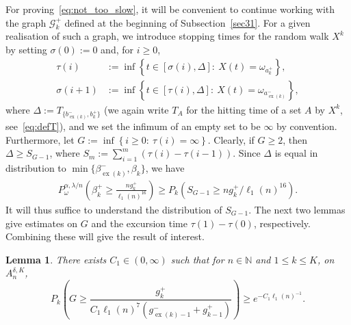 \documentclass[10pt]{amsart}
\newtheorem{lemm}[theo]{Lemma}\newtheorem{prop}[theo]{Proposition}\newtheorem{coro}[theo]{Corollary}\newtheorem{conj}[theo]{Conjecture}
\theoremstyle{definition}\newtheorem{defi}[theo]{Definition}\newtheorem{rema}[theo]{Remark}\newtheorem{exam}[theo]{Example}\newtheorem{exem}[theo]{Example}\newtheorem{nota}[theo]{Notation}
\newcommand{\N}{\mathbb N}
\newcommand{\clG}{\mathcal{G}}
\newcommand{\Pk}{{P_k}}
\newcommand\ex{\operatorname{ex}}
\newcommand{\aat}[1]{a_{\ex(#1)}^-}
\newcommand{\bt}[1]{b_{\ex(#1)}^-}
\newcommand{\gtt}[1]{g_{\ex(#1)-1}^-}
\newcommand{\betat}[1]{\beta^-_{\ex(#1)}}
\begin{document}
For proving~\eqref{eq:not_too_slow}, it will be convenient to continue working with the graph $\clG_k^+$ defined at the beginning of Subsection~\ref{sec31}. For a given realisation of such a graph, we introduce stopping times for the random walk $X^k$ by setting $\sigma(0):=0$ and, for $i\geq 0$,
\begin{align*}
\tau(i)&:=\inf\left\{t\in[\sigma(i),\Delta]:\:X(t)= \omega_{a_k^+}\right\},\\
\sigma(i+1)&:=\inf\left\{t\in [\tau(i),\Delta]:\:X(t)=\omega_{\aat{k}}\right\},
\end{align*}
where $\Delta:=T_{\{\bt{k},b_k^+\}}$ (we again write $T_A$ for the hitting time of a set $A$ by $X^k$, see~\eqref{eq:defT}), and we set the infimum of an empty set to be $\infty$ by convention. Furthermore, let $G:=\inf\left\{i\geq 0:\:\tau(i)=\infty\right\}$. Clearly, if $G\geq 2$, then $\Delta\geq S_{G-1}$, where $S_m:=\sum_{i=1}^{m}(\tau(i)-\tau(i-1))$. Since $\Delta$ is equal in distribution to $\min\{\betat{k},\beta_k\}$, we have
\begin{align}\label{eq:betatoS}
P_\omega^{\alpha,\lambda/n}\left(\beta_k^+\geq \frac{ng_k^+}{\ell_1(n)^{16}}\right)
\geq \Pk\left(S_{G-1}\geq ng_k^+/\ell_1(n)^{16}\right).
\end{align}
It will thus suffice to understand the distribution of $S_{G-1}$. The next two lemmas give estimates on $G$ and the excursion time $\tau(1)-\tau(0)$, respectively. Combining these will give the result of interest.

\begin{lemm}\label{lem:geom}
There exists $C_1\in (0,\infty)$ such that for $n\in\N$ and $1\leq k\leq K$, on~$A_n^{\delta,K}$,
\[
\Pk\left(G\geq \frac{ g_{k}^+}{C_1 \ell_1(n)^7\left(\gtt{k}+g_{k-1}^+\right)}\right)\geq e^{-C_1\ell_1(n)^{-1}}.
\]
\end{lemm}
\end{document}

